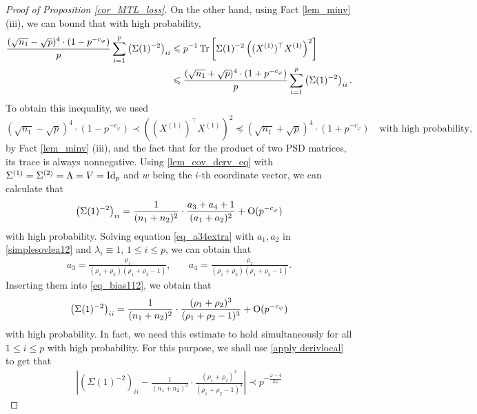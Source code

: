 \begin{proof}[Proof of Proposition \ref{cor_MTL_loss}]
On the other hand, using Fact \ref{lem_minv} (iii), we can bound that with high probability,
\begin{align}
 \frac{(\sqrt{n_1}-\sqrt{p})^4 \cdot (1- p^{-c_\varphi})}{p}\sum_{i=1}^p \left(\Sigma(1)^{-2}\right)_{ii}  &\leqslant {p}^{-1}\operatorname{Tr}\left[\Sigma(1)^{-2} \left((X^{(1)})^\top X^{(1)} \right)^2\right] \label{eq_bias111}\\ 
 &\leqslant \frac{(\sqrt{n_1}+\sqrt{p})^4 \cdot (1+ p^{-c_\varphi})}{p}\sum_{i=1}^p \left(\Sigma(1)^{-2}\right)_{ii} .\nonumber
\end{align}
To obtain this inequality, we used  
$$ (\sqrt{n_1}-\sqrt{p})^4 \cdot (1-p^{-c_\varphi}) \prec \left((X^{(1)})^\top X^{(1)} \right)^2 \preceq (\sqrt{n_1}+\sqrt{p})^4 \cdot (1+ p^{-c_\varphi}) \quad \text{with high probability},$$
by Fact \ref{lem_minv} (iii), and the fact that for the product of two PSD matrices, its trace is always nonnegative.
Using \eqref{lem_cov_derv_eq} with $\Sigma^{(1)}=\Sigma^{(2)}=\Lambda=V=\operatorname{Id}_p$ and $w$ being the $i$-th coordinate vector, we can calculate that 
\begin{align}\label{eq_bias112}
 \left(\Sigma(1)^{-2}\right)_{ii} = \frac{1}{(n_1+n_2)^2}\cdot \frac{a_3+a_4+1}{(a_1+a_2)^2} +\operatorname{O}(p^{-c_\varphi})
\end{align}
with high probability. Solving equation \eqref{eq_a34extra} with $a_1, a_2$ in \eqref{simplesovlea12} and $\lambda_i\equiv 1$, $1\le i\le p$, we can obtain that
	\begin{align}
		a_3 = \frac{\rho_1}{(\rho_1 + \rho_2)(\rho_1 + \rho_2 - 1)}, \quad
		&  a_4 = \frac{\rho_2}{(\rho_1 + \rho_2)(\rho_1 + \rho_2 - 1)}.\label{simplesovlea34}
	\end{align}
Inserting them into \eqref{eq_bias112}, we obtain that 
\begin{align*}%
 \left(\Sigma(1)^{-2}\right)_{ii} = \frac{1}{(n_1+n_2)^2}\cdot \frac{(\rho_1+\rho_2)^3}{(\rho_1+\rho_2-1)^3} +\OO(p^{-c_\varphi})
\end{align*}
with high probability. In fact, we need this estimate to hold simultaneously for all $1\le i \le p$ with high probability. For this purpose, we shall use \eqref{apply derivlocal} to get that 
\begin{align*}%
\left| \left(\Sigma(1)^{-2}\right)_{ii} - \frac{1}{(n_1+n_2)^2}\cdot \frac{(\rho_1+\rho_2)^3}{(\rho_1+\rho_2-1)^3}\right|\prec p^{-\frac{\varphi-4}{2\varphi}}

\end{align*}
\end{proof}
